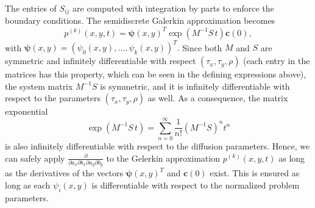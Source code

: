 \documentclass[10pt]{article}
\begin{document}
The entries of $S_{ij}$ are computed with integration by parts to
enforce the boundary conditions. The semidiscrete Galerkin approximation
becomes
\[
  p^{(k)}(x,y,t) = \boldsymbol{\psi}(x,y)^T \exp\left( M^{-1}S\, t \right) \mathbf{c}(0),
\]
with $\boldsymbol{\psi}(x,y) = (\psi_0(x,y), \ldots, \psi_k(x,y))^T.$
Since both $M$ and $S$ are symmetric and infinitely differentiable
with respect $(\tau_x, \tau_y, \rho)$ (each entry in the matrices has
this property, which can be seen in the defining expressions above),
the system matrix $M^{-1}S$ is symmetric, and it is infinitely
differentiable with respect to the parameters $(\tau_x, \tau_y, \rho)$
as well. As a consequence, the matrix exponential
\[
  \exp\left( M^{-1}S\, t \right) = \sum_{n=0}^\infty \frac{1}{n!}
  \left(M^{-1}S\right)^n t^n
\]
is also infinitely differentiable with respect to the diffusion
parameters. Hence, we can safely apply
$\frac{\partial}{\partial a_x \partial b_x \partial a_y \partial b_y}$
to the Gelerkin approximation $p^{(k)}(x,y,t)$ as long as the
derivatives of the vectors $\boldsymbol{\psi}(x,y)^T$ and
$\mathbf{c}(0)$ exist. This is ensured as long as each $\psi_i(x,y)$
is differentiable with respect to the normalized problem parameters.
\end{document}
